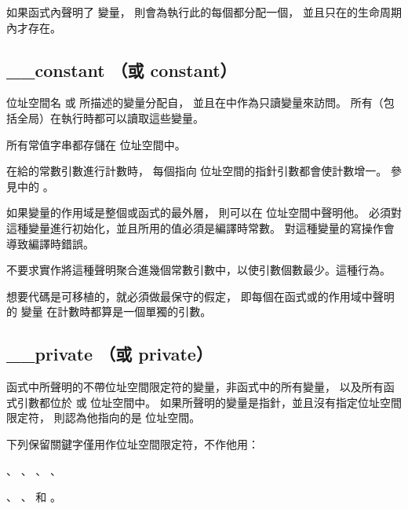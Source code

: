 \startnotepar
如果函式內聲明了  變量，
則會為執行此的每個都分配一個，
並且只在的生命周期內才存在。
\stopnotepar

\subsection{__constant （或 constant）}

位址空間名  或  所描述的變量分配自，
並且在中作為只讀變量來訪問。
所有（包括全局）在執行時都可以讀取這些變量。

所有常值字串都存儲在  位址空間中。

\startnotepar
在給的常數引數進行計數時，
每個指向  位址空間的指針引數都會使計數增一。
參見中的 。
\stopnotepar

如果變量的作用域是整個或函式的最外層，
則可以在  位址空間中聲明他。
必須對這種變量進行初始化，並且所用的值必須是編譯時常數。
對這種變量的寫操作會導致編譯時錯誤。

不要求實作將這種聲明聚合進幾個常數引數中，以使引數個數最少。這種行為。

想要代碼是可移植的，就必須做最保守的假定，
即每個在函式或的作用域中聲明的  變量
在計數時都算是一個單獨的引數。

\subsection{__private （或 private）}

函式中所聲明的不帶位址空間限定符的變量，非函式中的所有變量，
以及所有函式引數都位於  或  位址空間中。
如果所聲明的變量是指針，並且沒有指定位址空間限定符，
則認為他指向的是  位址空間。

下列保留關鍵字僅用作位址空間限定符，不作他用：
\startigBase
\item {}、 、 、 、
\item {}、 、  和 。
\stopigBase
